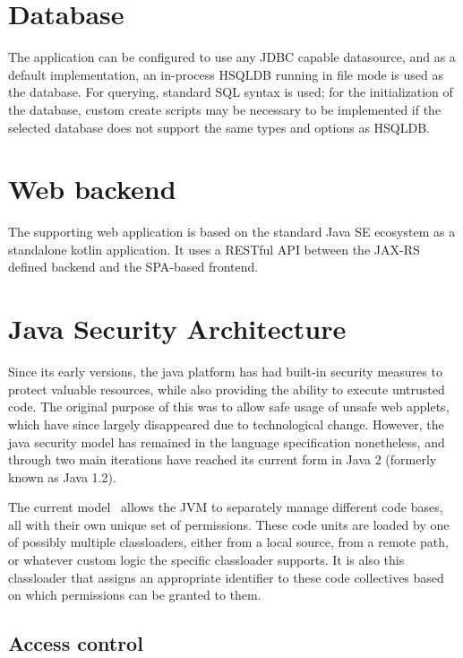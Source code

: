 	\section{Database}
 
 	The application can be configured to use any JDBC capable datasource, and as a default implementation, an in-process HSQLDB running in file mode is used as the database. For querying, standard SQL syntax is used; for the initialization of the database, custom create scripts may be necessary to be implemented if the selected database does not support the same types and options as HSQLDB.

	\section{Web backend}
	
	The supporting web application is based on the standard Java SE ecosystem as a standalone kotlin application. It uses a RESTful API between the JAX-RS defined backend and the SPA-based frontend.

	\section{Java Security Architecture}
	
	Since its early versions, the java platform has had built-in security measures to protect valuable resources, while also providing the ability to execute untrusted code. The original purpose of this was to allow safe usage of unsafe web applets, which have since largely disappeared due to technological change. However, the java security model has remained in the language specification nonetheless, and through two main iterations have reached its current form in Java 2 (formerly known as Java 1.2).
	
	The current model~\cite{JavaSandbox} allows the JVM to separately manage different code bases, all with their own unique set of permissions. These code units are loaded by one of possibly multiple classloaders, either from a local source, from a remote path, or whatever custom logic the specific classloader supports. It is also this classloader that assigns an appropriate identifier to these code collectives based on which permissions can be granted to them.
	
	\subsection{Access control}
	
